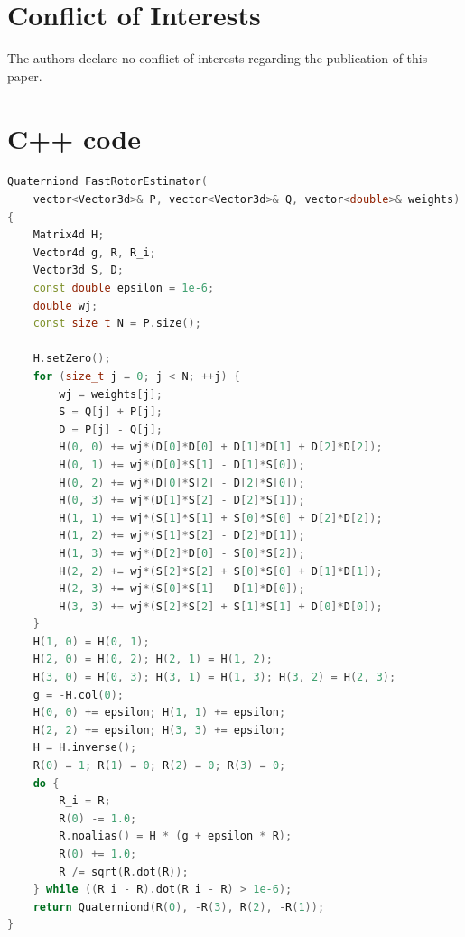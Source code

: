 \documentclass{birkjour}
\numberwithin{equation}{section}
\begin{document}
\section{Conflict of Interests}
The authors declare no conflict of interests regarding the publication of this paper.

\section{C++ code}

\begin{lstlisting}[language=C++, caption=C++ code for rotor estimation, basicstyle=\tiny, keywordstyle=\bfseries, label=lst:cppcode, morekeywords={Matrix4d,Vector4d,Vector3d,Quaterniond,sqrt}]
Quaterniond FastRotorEstimator(
	vector<Vector3d>& P, vector<Vector3d>& Q, vector<double>& weights)
{
	Matrix4d H;
	Vector4d g, R, R_i;
	Vector3d S, D;
	const double epsilon = 1e-6;
	double wj;
	const size_t N = P.size();

	H.setZero();
	for (size_t j = 0; j < N; ++j) {
		wj = weights[j];
		S = Q[j] + P[j];
		D = P[j] - Q[j];
		H(0, 0) += wj*(D[0]*D[0] + D[1]*D[1] + D[2]*D[2]);
		H(0, 1) += wj*(D[0]*S[1] - D[1]*S[0]);
		H(0, 2) += wj*(D[0]*S[2] - D[2]*S[0]);
		H(0, 3) += wj*(D[1]*S[2] - D[2]*S[1]);
		H(1, 1) += wj*(S[1]*S[1] + S[0]*S[0] + D[2]*D[2]);
		H(1, 2) += wj*(S[1]*S[2] - D[2]*D[1]);
		H(1, 3) += wj*(D[2]*D[0] - S[0]*S[2]);
		H(2, 2) += wj*(S[2]*S[2] + S[0]*S[0] + D[1]*D[1]);
		H(2, 3) += wj*(S[0]*S[1] - D[1]*D[0]);
		H(3, 3) += wj*(S[2]*S[2] + S[1]*S[1] + D[0]*D[0]);
	}
	H(1, 0) = H(0, 1);
	H(2, 0) = H(0, 2); H(2, 1) = H(1, 2);
	H(3, 0) = H(0, 3); H(3, 1) = H(1, 3); H(3, 2) = H(2, 3);
	g = -H.col(0);
	H(0, 0) += epsilon; H(1, 1) += epsilon; 
	H(2, 2) += epsilon; H(3, 3) += epsilon;
	H = H.inverse();
	R(0) = 1; R(1) = 0; R(2) = 0; R(3) = 0;
	do {
		R_i = R;
		R(0) -= 1.0;
		R.noalias() = H * (g + epsilon * R);
		R(0) += 1.0;
		R /= sqrt(R.dot(R));
	} while ((R_i - R).dot(R_i - R) > 1e-6);
	return Quaterniond(R(0), -R(3), R(2), -R(1));
}
\end{lstlisting}




\end{document}
